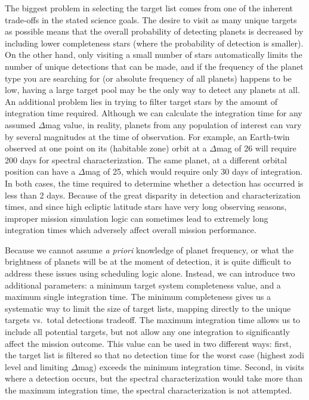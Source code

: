 The biggest problem in selecting the target list comes from one of the inherent trade-offs in the stated science goals.  The desire to visit as many unique targets as possible means that the overall probability of detecting planets is decreased by including lower completeness stars (where the probability of detection is smaller).  On the other hand,  only visiting a small number of stars automatically limits the number of unique detections that can be made, and if the frequency of the planet type you are searching for (or absolute frequency of all planets) happens to be low, having a large target pool may be the only way to detect any planets at all.  An additional problem lies in trying to filter target stars by the amount of integration time required.  Although we can calculate the integration time for any assumed $\Delta$mag value, in reality, planets from any population of interest can vary by several magnitudes at the time of observation.  For example, an Earth-twin observed at one point on its (habitable zone) orbit at a $\Delta$mag of 26 will require 200 days for spectral characterization.  The same planet, at a different orbital position can have a $\Delta$mag of 25, which would require only 30 days of integration.  In both cases, the time required to determine whether a detection has occurred is less than 2 days.  Because of the great disparity in detection and characterization times, and since high ecliptic latitude stars have very long observing seasons, improper mission simulation logic can sometimes lead to extremely long integration times which adversely affect overall mission performance.

Because we cannot assume \emph{a priori} knowledge of  planet frequency, or what the brightness of planets will be at the moment of detection, it is quite difficult to address these issues using scheduling logic alone.  Instead, we can introduce two additional parameters: a minimum target system completeness value, and a maximum single integration time.  The minimum completeness gives us a systematic way to limit the size of target lists, mapping directly to the unique targets vs.~total detections tradeoff. The maximum integration time allows us to include all potential targets, but not allow any one integration to significantly affect the mission outcome.  This value can be used in two different ways: first, the target list is filtered so that no detection time for the worst case (highest zodi level and limiting $\Delta$mag) exceeds the minimum integration time.  Second, in visits where a detection occurs, but the spectral characterization would take more than the maximum integration time, the spectral characterization is not attempted. 


